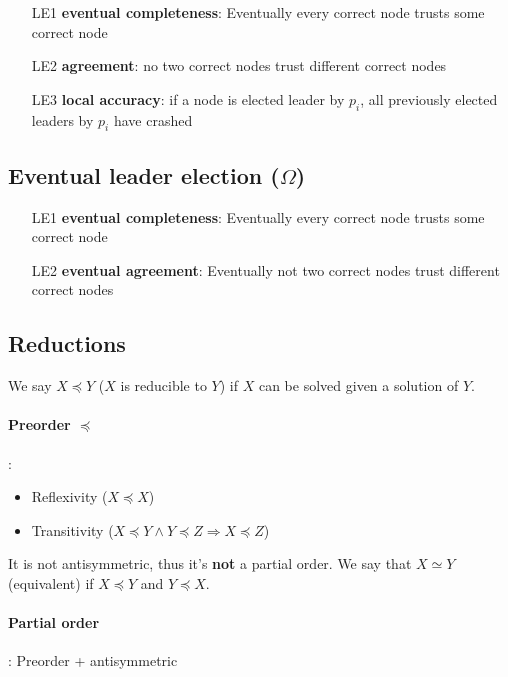     

\begin{enumerate}
    \item[LE1] \textbf{eventual completeness}: Eventually every correct node
    trusts some correct node
    \item[LE2] \textbf{agreement}: no two correct nodes trust different correct
    nodes
    \item[LE3] \textbf{local accuracy}: if a node is elected leader by $p_i$,
    all previously elected leaders by $p_i$ have crashed
    \end{enumerate}

\subsection{Eventual leader election ($\Omega$)}

    

\begin{enumerate}
    \item[LE1] \textbf{eventual completeness}: Eventually every correct node
    trusts some correct node
    \item[LE2] \textbf{eventual agreement}: Eventually not two correct nodes trust different correct
    nodes
\end{enumerate}


\subsection{Reductions}
We say $X \preceq Y$ ($X$ is reducible to $Y$) if $X$ can be solved given a
solution of $Y$.

\paragraph{Preorder $\preceq$}:
\begin{itemize}
    \item Reflexivity ($X \preceq X$)
    \item Transitivity ($X \preceq Y \land Y \preceq Z \Rightarrow X \preceq Z$)
\end{itemize}
It is not antisymmetric, thus it's \textbf{not} a partial order.
 We say that $X \simeq Y$ (equivalent) if $X \preceq Y$ and $Y \preceq X$.

\paragraph{Partial order}:
Preorder + antisymmetric

